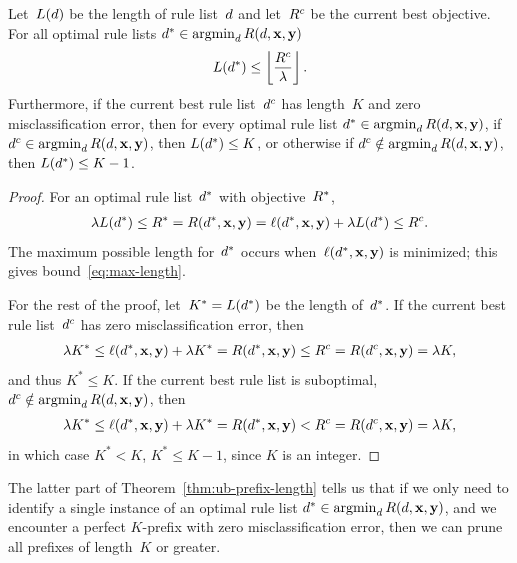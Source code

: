 \begin{theorem}
\label{thm:ub-prefix-length}
Let~$L({d})$ be the length of rule list~${d}$
and let~${R^c}$ be the current best objective.
For all optimal rule lists ${d^* \in \operatorname*{argmin}_{d} R({d}, \mathbf{x}, \mathbf{y})}$
\begin{align}
L(\OptimalRL) \le \left\lfloor \frac{\CurrentObj}{\Reg} \right\rfloor.
\label{eq:max-length}
\end{align}
Furthermore, if the current best rule list~$d^c$
has length~$K$ and zero misclassification error,
then for every optimal rule list
${d^* \in \operatorname*{argmin}_{d} R({d}, \mathbf{x}, \mathbf{y})}$,
if ${d^c \in \operatorname*{argmin}_d R({d}, \mathbf{x}, \mathbf{y})}$,
then ${L(d^*) \le K}$,
or otherwise if ${d^c \notin \operatorname*{argmin}_d R({d}, \mathbf{x}, \mathbf{y})}$,
then ${L(d^*) \le K - 1}$.
\end{theorem}

\begin{proof}
For an optimal rule list~$d^*$ with objective~$R^*$,
\begin{align}
\Reg L(\OptimalRL) \le \OptimalObj = \Obj(\OptimalRL, \x, \y)
= \Loss(\OptimalRL, \x, \y) + \Reg L(\OptimalRL)
\le \CurrentObj.
\end{align}
The maximum possible length for~$d^*$ occurs
when~$\ell(d^*, \mathbf{x}, \mathbf{y})$ is minimized;
this gives bound~\eqref{eq:max-length}.

For the rest of the proof,
let~${K^* = L(d^*)}$ be the length of~$d^*$.
%
If the current best rule list~$d^c$ has zero
misclassification error, then
\begin{align}
\Reg K^* \leq \Loss(\OptimalRL, \x, \y) + \Reg K^* = \Obj(\OptimalRL, \x, \y)
\le \CurrentObj = \Obj(\CurrentRL, \x, \y) = \Reg K,
\end{align}
and thus ${K^* \leq K}$.
%
If the current best rule list is suboptimal,
\ie ${d^c \notin \operatorname*{argmin}_{d} R({d}, \mathbf{x}, \mathbf{y})}$, then
%
\begin{align}
\Reg K^* \leq \Loss(\OptimalRL, \x, \y) + \Reg K^* = \Obj(\OptimalRL, \x, \y)
< \CurrentObj = \Obj(\CurrentRL, \x, \y) = \Reg K,
\end{align}
in which case ${K^* < K}$, \ie ${K^* \leq K-1}$, since $K$ is an integer.
\end{proof}

The latter part of Theorem~\ref{thm:ub-prefix-length} tells us that
if we only need to identify a single instance of an optimal rule list
${d^* \in \operatorname*{argmin}_{d} R({d}, \mathbf{x}, \mathbf{y})}$, and we encounter a perfect
$K$-prefix with zero misclassification error, then we can prune all
prefixes of length~$K$ or greater.

